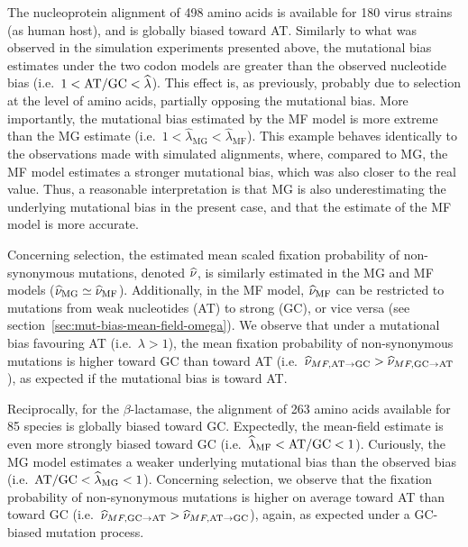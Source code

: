 \documentclass{article}
\begin{document}
The nucleoprotein alignment of 498 amino acids is available for 180 virus strains (as human host), and is globally biased toward AT.
Similarly to what was observed in the simulation experiments presented above, the mutational bias estimates under the two codon models are greater than the observed nucleotide bias (i.e.~$1 < \text{AT/GC} < \widehat{\lambda}$).
This effect is, as previously, probably due to selection at the level of amino acids, partially opposing the mutational bias.
More importantly, the mutational bias estimated by the {MF} model is more extreme than the {MG} estimate (i.e.~$1 < \widehat{\lambda}_{\text{{MG}}} < \widehat{\lambda}_{\text{{MF}}}$).
This example behaves identically to the observations made with simulated alignments, where, compared to {MG}, the {MF} model estimates a stronger mutational bias, which was also closer to the real value.
Thus, a reasonable interpretation is that {MG} is also underestimating the underlying mutational bias in the present case, and that the estimate of the {MF} model is more accurate.

Concerning selection, the estimated mean scaled fixation probability of {non-synonymous} mutations, denoted $\widehat{\nu}$, is similarly estimated in the {MG} and {MF} models ($\widehat{\nu}_{\text{{MG}}} \simeq \widehat{\nu}_{\text{{MF}}}$).
Additionally, in the {MF} model, $\widehat{\nu}_{\text{{MF}}}$ can be restricted to mutations from weak nucleotides (AT) to strong (GC), or vice versa (see section~\ref{sec:mut-bias-mean-field-omega}).
We observe that under a mutational bias favouring AT (i.e.~$\lambda > 1$), the mean fixation probability of {non-synonymous} mutations is higher toward GC than toward AT (i.e.~$\widehat{\nu}_{MF,\text{AT} \rightarrow \text{GC}} > \widehat{\nu}_{MF,\text{GC} \rightarrow \text{AT}}$), as expected if the mutational bias is toward AT.

Reciprocally, for the $\beta$-lactamase, the alignment of 263 amino acids available for 85 species is globally biased toward GC.
Expectedly, the mean-field estimate is even more strongly biased toward GC (i.e.~$\widehat{\lambda}_{\text{{MF}}} < \text{AT/GC} < 1$).
Curiously, the {MG} model estimates a weaker underlying mutational bias than the observed bias (i.e.~$ \text{AT/GC} < \widehat{\lambda}_{\text{{MG}}} < 1$).
Concerning selection, we observe that the fixation probability of {non-synonymous} mutations is higher on average toward AT than toward GC (i.e.~$\widehat{\nu}_{MF,\text{GC} \rightarrow \text{AT}} > \widehat{\nu}_{MF,\text{AT} \rightarrow \text{GC}}$), again, as expected under a GC-biased mutation process.
\end{document}
